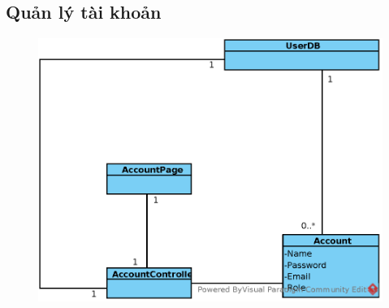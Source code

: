 \documentclass[./../main_file.tex]{subfiles}
\begin{document}
\subsection{Quản lý tài khoản}
\begin{figure}[H]
	\centering
	\includegraphics[width=\linewidth]{./images/define_attribute/ucd_at_ss_account_manage.eps}
\end{figure}
\end{document}

